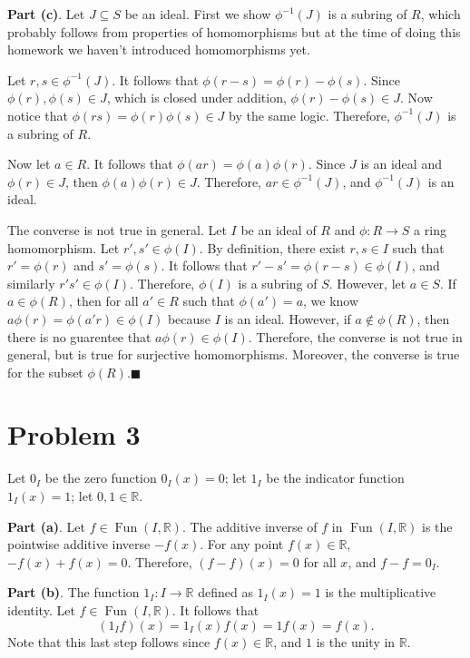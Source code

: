 \documentclass[11pt, letterpaper]{report}
\begin{document}
\noindent \textbf{Part (c)}. Let $J\subseteq S$ be an ideal. First we show $\phi ^{-1}(J)$ is a subring of $R$, which probably follows from properties of homomorphisms but at the time of doing this homework we haven't introduced homomorphisms yet. 

Let $r,s\in \phi ^{-1}(J)$. It follows that $\phi (r-s)=\phi (r)-\phi (s)$. Since $\phi (r),\phi (s)\in J$, which is closed under addition, $\phi (r)-\phi (s)\in J$. Now notice that  $\phi (rs)=\phi (r)\phi (s)\in J$ by the same logic. Therefore, $\phi ^{-1}(J)$ is a subring of $R$.

Now let $a\in R$. It follows that $\phi (ar)=\phi (a)\phi (r)$. Since $J$ is an ideal and $\phi (r)\in J$, then $\phi (a)\phi (r)\in J$. Therefore, $ar\in \phi ^{-1}(J)$, and $\phi ^{-1}(J)$ is an ideal.

The converse is not true in general. Let $I$ be an ideal of $R$ and $\phi : R \to S$ a ring homomorphism. Let $r',s'\in \phi (I)$. By definition, there exist $r,s\in I$ such that $r'=\phi (r)$ and $s'=\phi (s)$. It follows that $r'-s'=\phi (r-s)\in\phi (I)$, and similarly $r's'\in \phi (I)$. Therefore, $\phi (I)$ is a subring of $S$. However, let $a\in S$. If $a\in \phi (R)$, then for all $a'\in R$ such that $\phi (a')=a$, we know $a\phi (r)=\phi (a'r)\in\phi (I)$ because $I$ is an ideal. However, if $a\notin \phi (R)$, then there is no guarentee that $a\phi (r)\in \phi (I)$. Therefore, the converse is not true in general, but is true for surjective homomorphisms. Moreover, the converse is true for the subset $\phi (R)$.\hfill $\blacksquare$
\section*{Problem 3}
\begin{notation}
	Let $0_I$ be the zero function $0_I(x)=0$; let $1_I$ be the indicator function $1_I(x)=1$; let $0,1\in\mathbb{R}$.
\end{notation}
\noindent\textbf{Part (a)}. Let $f\in \operatorname{Fun}(I,\mathbb{R}) $. The additive inverse of $f$ in $\operatorname{Fun}(I,\mathbb{R}) $ is the pointwise additive inverse $-f(x)$. For any point $f(x)\in\mathbb{R}$, $-f(x)+f(x)=0$. Therefore, $(f-f)(x)=0$ for all $x$, and $f-f=0_I$.

\noindent \textbf{Part (b)}. The function $1_I : I \to \mathbb{R}$ defined as  $1_I(x)=1$ is the multiplicative identity. Let $f\in \operatorname{Fun}(I,\mathbb{R}) $. It follows that
\[
	(1_If)(x)=1_I(x)f(x)=1f(x)=f(x)
.\]
Note that this last step follows since $f(x)\in\mathbb{R}$, and $1$ is the unity in $\mathbb{R}$.
\end{document}
